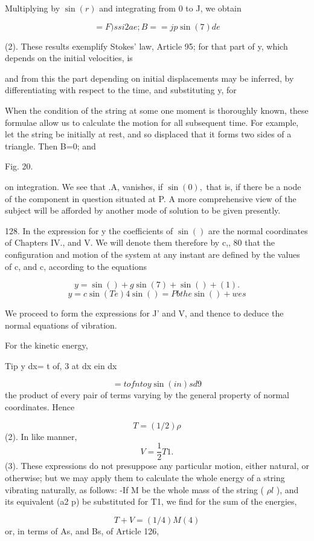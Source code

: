 Multiplying by \(\sin(r)\) and integrating from 0 to J, we obtain

\[=F) ssi 2 ae; B= =  jp \sin(7) de\]

(2). These results exemplify Stokes' law, Article 95; for that part of y, which
depends on the initial velocities, is

and from this the part depending on initial displacements may be inferred, by
differentiating with respect to the time, and substituting y, for

When the condition of the string at some one moment is thoroughly known, these
formulae allow us to calculate the motion for all subsequent time. For example,
let the string be initially at rest, and so displaced that it forms two sides
of a triangle. Then B=0; and

Fig. 20.

on integration. We see that .A, vanishes, if \(\sin(0),\) that is, if there be
a node of the component in question situated at P. A more comprehensive view of
the subject will be afforded by another mode of solution to be given presently.

128. In the expression for y the coefficients of \(\sin()\) are the normal
coordinates of Chapters IV., and V. We will denote them therefore by c,, 80
that the configuration and motion of the system at any instant are defined by
the values of c, and c, according to the equations

\[y= \sin()+g \sin(7) + \sin()+ (1).\]
\[y= c \sin(Te) 4 \sin()= Pb the \sin()+ wes\]

We proceed to form the expressions for J' and V, and thence to deduce the
normal equations of vibration.

For the kinetic energy,

Tip y dx= t of, 3 at dx ein dx

\[= t of  nt oy \sin(in) sd 9\]
the product of every pair of terms varying by
the general property of normal coordinates. Hence

\[T= (1/2) \rho \]
(2).  In like manner,
\[V=\frac{1}{2} T 1.\]
(3).  These
expressions do not presuppose any particular motion, either natural, or
otherwise; but we may apply them to calculate the whole energy of a string
vibrating naturally, as follows: -If M be the whole mass of the string ( \(\rho
l\) ), and its equivalent (a2 p) be substituted for T1, we find for the sum of
the energies,

\[T+V= (1/4) M (4)\]
or, in terms of As, and Bs, of Article 126,

